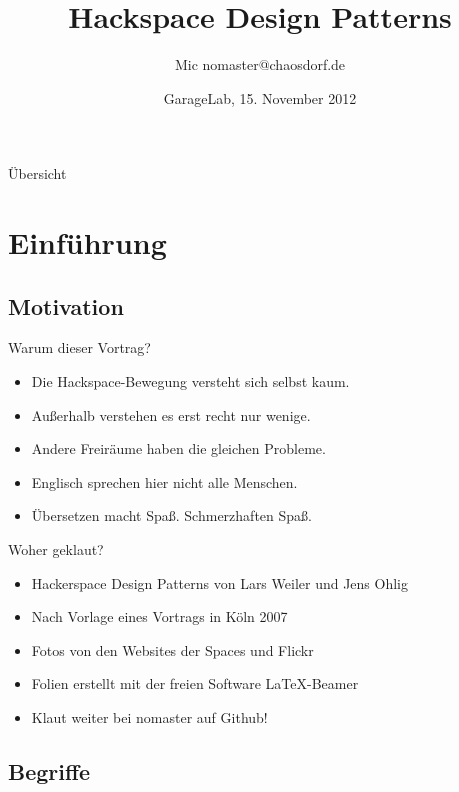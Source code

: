 \documentclass[aspectratio=43]{beamer}
\title{Hackspace Design Patterns}
\author[Mic]{Mic \flq nomaster@chaosdorf.de\frq}
\institute[chaosdorf]{Chaos Computer Club Düsseldorf / Chaosdorf e.V.}
\date[]{GarageLab, 15. November 2012}
\begin{document}
  \begin{frame}
    \titlepage
  \end{frame}

  \begin{frame}{Übersicht}
    \tableofcontents
  \end{frame}

  \section{Einführung}

  \subsection{Motivation}

  \begin{frame}{Warum dieser Vortrag?}
    \begin{itemize}
      \item Die Hackspace-Bewegung versteht sich selbst kaum.
      \pause
      \item Außerhalb verstehen es erst recht nur wenige.
      \pause
      \item Andere Freiräume haben die gleichen Probleme.
      \pause
      \item Englisch sprechen hier nicht alle Menschen.
      \pause
      \item Übersetzen macht Spaß. Schmerzhaften Spaß.
    \end{itemize}
  \end{frame}

  \begin{frame}{Woher geklaut?}
    \begin{itemize}
      \item Hackerspace Design Patterns von Lars Weiler und Jens Ohlig
      \item Nach Vorlage eines Vortrags in Köln 2007
      \pause
      \item Fotos von den Websites der Spaces und Flickr
      \item Folien erstellt mit der freien Software \LaTeX-Beamer
      \pause
      \item Klaut weiter bei nomaster auf Github!
    \end{itemize}
  \end{frame}

  \subsection{Begriffe}
\end{document}

